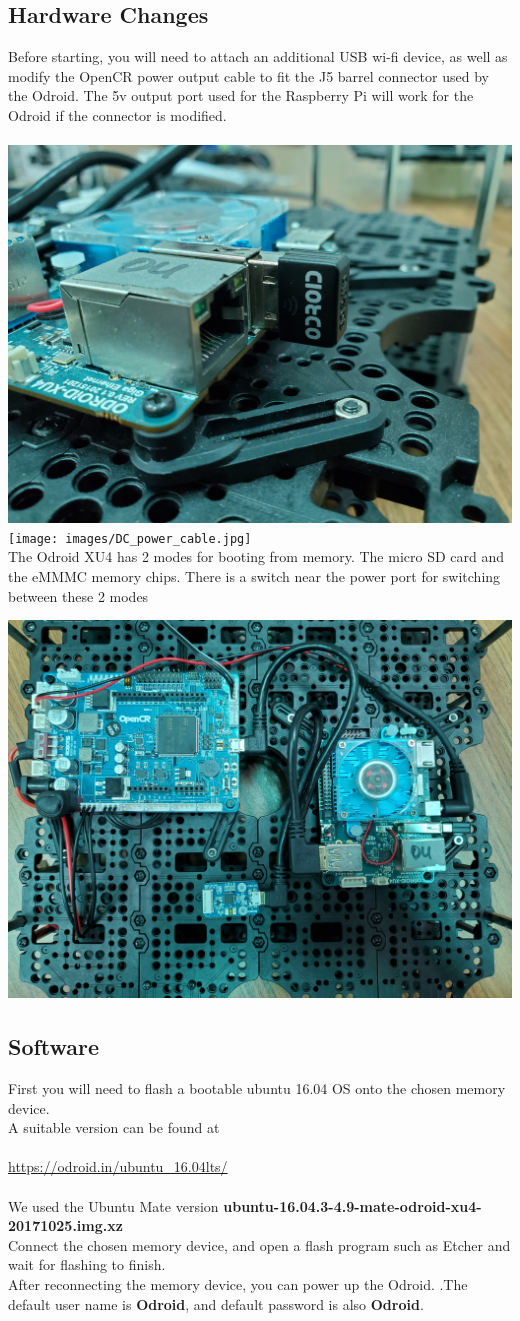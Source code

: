 \documentclass[12]{article}
\begin{document}
\subsection{Hardware Changes}
Before starting, you will need to attach an additional USB wi-fi device, as well as modify the OpenCR power output cable to fit the J5 barrel connector used by the Odroid. The 5v output port used for the Raspberry Pi will work for the Odroid if the connector is modified.\\\\
\includegraphics[width=0.5\linewidth]{images/WIFI_chip.jpg}
\texttt{[image: images/DC\_power\_cable.jpg]}\\
The Odroid XU4 has 2 modes for booting from memory. The micro SD card and the eMMMC memory chips. There is a switch near the power port for switching between these 2 modes\\
\begin{center}
\includegraphics[width=0.75\linewidth]{images/ODROID_top.jpg}\\
\end{center}
\subsection{Software}
First you will need to flash a bootable ubuntu 16.04 OS onto the chosen memory device.\\
A suitable version can be found at\\\\
\url{https://odroid.in/ubuntu_16.04lts/}\\\\
We used the Ubuntu Mate version \textbf{ubuntu-16.04.3-4.9-mate-odroid-xu4-20171025.img.xz}\\
Connect the chosen memory device, and open a flash program such as Etcher and wait for flashing to finish.\\
After reconnecting the memory device, you can power up the Odroid. .The default user name is \textbf{Odroid}, and default password is also \textbf{Odroid}.\\
\end{document}

